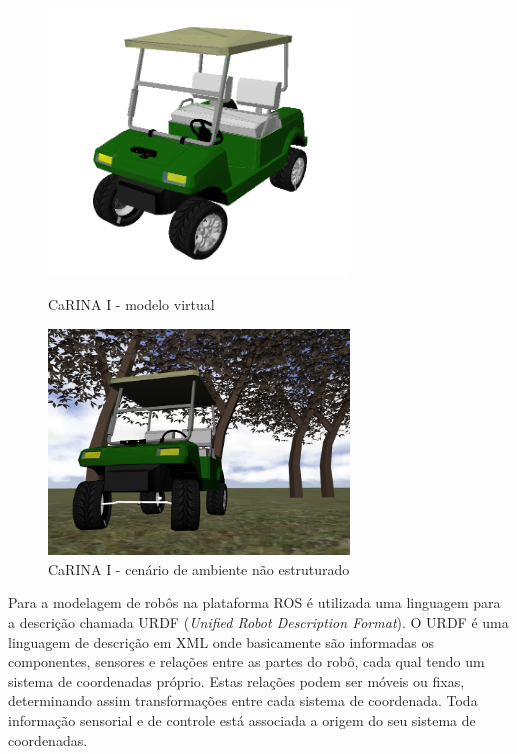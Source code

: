 \begin{figure}[ht]
	\begin{minipage}[b]{0.4\linewidth}
	    \centering
	    \includegraphics[width=8cm]{modelo_carina/carina_rviz_fundo_branco_sem_grid.png}
	 	\caption{CaRINA I - modelo virtual}
	 	\label{fig:model}
	\end{minipage}
	\hspace{1cm}
	\begin{minipage}[b]{0.4\linewidth}
	    \centering
	    \includegraphics[width=8cm]{modelo_carina/carina_gazebo_frente_fundo.png}
	 	\caption{CaRINA I - cenário de ambiente não estruturado}
	 	\label{fig:gazebo}
	\end{minipage}
\end{figure}

Para a modelagem de robôs na plataforma ROS é utilizada uma linguagem para a
descrição chamada URDF (\textit{Unified Robot Description Format}). O URDF é
uma linguagem de descrição em XML onde basicamente são informadas os componentes,
sensores e relações entre as partes do robô, cada qual tendo um sistema de
coordenadas próprio. Estas relações podem ser móveis ou fixas, determinando
assim transformações entre cada sistema de coordenada. Toda informação sensorial
e de controle está associada a origem do seu sistema de coordenadas.

